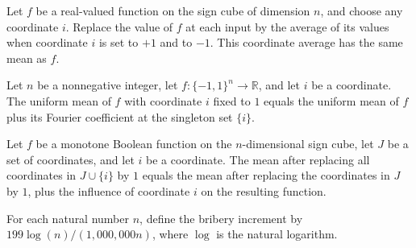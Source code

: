 \begin{theorem}
\label{FABL.mean_coordinateExpectation}
\leanok
{}
Let $f$ be a real-valued function on the sign cube of dimension $n$, and choose any
coordinate $i$. Replace the value of $f$ at each input by the average of its values when
coordinate $i$ is set to $+1$ and to $-1$. This coordinate average has the same mean as
$f$.
\end{theorem}

\begin{theorem}
\label{FABL.mean_fixCoordinate_one}
\leanok
{}
Let $n$ be a nonnegative integer, let $f:\{−1,1\}^n\to\mathbb R$, and let $i$ be a
coordinate. The uniform mean of $f$ with coordinate $i$ fixed to $1$ equals the uniform
mean of $f$ plus its Fourier coefficient at the singleton set $\{i\}$.
\end{theorem}

\begin{theorem}
\label{FABL.mean_bribeFunction_insert_one}
\leanok
{}
Let $f$ be a monotone Boolean function on the $n$-dimensional sign cube, let $J$ be a
set of coordinates, and let $i$ be a coordinate. The mean after replacing all
coordinates in $J\cup\{i\}$ by $1$ equals the mean after replacing the coordinates in
$J$ by $1$, plus the influence of coordinate $i$ on the resulting function.
\end{theorem}

\begin{definition}
\label{FABL.briberyIncrement}
\leanok
For each natural number $n$, define the bribery increment by
$199\log(n)/(1{,}000{,}000n)$, where $\log$ is the natural logarithm.
\end{definition}

